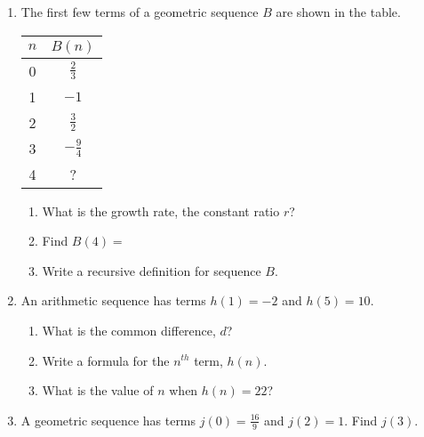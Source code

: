 \documentclass[12pt, twoside]{article}
\begin{document}
\begin{enumerate}
\newpage
\item The first few terms of a geometric sequence $B$ are shown in the table.
\begin{multicols}{2}
    \renewcommand{\arraystretch}{2}
    \hspace{1cm}
    \begin{tabular}{c|c}
        $n$ & $B(n)$ \\ \hline
        0 & $\displaystyle \frac{2}{3}$ \\ 
        1 & $-1$ \\ 
        2 & $\displaystyle \frac{3}{2}$ \\ 
        3 & $\displaystyle -\frac{9}{4}$ \\ 
        4 & ? \\ 
    \end{tabular}
    \begin{enumerate}[itemsep=1cm]
        \item What is the growth rate, the constant ratio $r$?
        \item Find $B(4)=$
        \item Write a recursive definition for sequence $B$.
    \end{enumerate}
\end{multicols} \vspace{1cm}

\item An arithmetic sequence has terms $h(1)=-2$ and $h(5)=10$.
    \begin{enumerate}
        \item What is the common difference, $d$? \vspace{2cm}
        \item Write a formula for the $n^{th}$ term, $h(n)$. \vspace{2cm}
        \item What is the value of $n$ when $h(n)=22$?
    \end{enumerate} \vspace{2cm}

\item A geometric sequence has terms $\displaystyle j(0)=\frac{16}{9}$ and $j(2)=1$. Find $j(3)$.


\end{enumerate}
\end{document}
